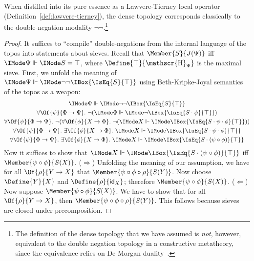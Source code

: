 \documentclass{article}
\DeclareMathOperator\OpYoneda{\mathscr{H}}
\newcommand\Yoneda[1]{\OpYoneda_{#1}}
\newcommand\ArrId[1]{\mathsf{id}_{#1}}
\begin{document}
\begin{lem}
  When distilled into its pure essence as a Lawvere-Tierney local
  operator (Definition~\ref{def:lawvere-tierney}), the dense topology
  corresponds classically to the double-negation modality
  $\lnot\lnot$.\footnote{The definition of the dense topology that we
    have assumed is \emph{not}, however, equivalent to the double
    negation topology in a constructive metatheory, since the
    equivalence relies on De Morgan
    duality~\cite{spitters:2010,coquand:2013}.}
\end{lem}
\begin{proof}
  It suffices to ``compile'' double-negations from the internal
  language of the topos into statements about sieves. Recall that
  $\Member{S}{J(\Psi)}$ iff $\Forces{\Psi}{S=\top}$, where
  $\Define{\top}{\Yoneda{\Psi}}$ is the maximal sieve. First, we
  unfold the meaning of
  $\Forces{\Psi}{\lnot\lnot\IBox{\IsEq{S}{\top}}}$ using
  Beth-Kripke-Joyal semantics of the topos as a weapon:
  \begin{gather}
    \Forces{\Psi}{\lnot\lnot\IBox{\IsEq{S}{\top}}}
    \\
    \forall\Of{\psi}{\Phi\to\Psi}.\
    \lnot(\Forces{\Phi}{\lnot\IBox{\IsEq{S\cdot\psi}{\top}}})
    \\
    \forall\Of{\psi}{\Phi\to\Psi}.\
    \lnot(
      \forall\Of{\phi}{X\to\Phi}.\
      \lnot(\Forces{X}{\IBox{\IsEq{S\cdot\psi\cdot\phi}{\top}}})
    )
    \label{de-morgan-1}
    \\
    \forall\Of{\psi}{\Phi\to\Psi}.\
    \exists\Of{\phi}{X\to \Phi}.\
    \Forces{X}{\IBox{\IsEq{S\cdot\psi\cdot\phi}{\top}}}
    \label{de-morgan-2}
    \\
    \forall\Of{\psi}{\Phi\to\Psi}.\
    \exists\Of{\phi}{X\to \Phi}.\
    \Forces{X}{\IBox{\IsEq{S\cdot(\psi\circ\phi)}{\top}}}
  \end{gather}
  Now it suffices to show that
  $\Forces{X}{\IBox{\IsEq{S\cdot(\psi\circ\phi)}{\top}}}$ iff
  $\Member{\psi\circ\phi}{S(X)}$.
  ($\Rightarrow$) Unfolding the meaning of our assumption, we have for
  all $\Of{\rho}{Y\to X}$ that
  $\Member{\psi\circ\phi\circ\rho}{S(Y)}$. Now choose $\Define{Y}{X}$
  and $\Define{\rho}{\ArrId{X}}$; therefore
  $\Member{\psi\circ\phi}{S(X)}$.
  ($\Leftarrow$) Now suppose $\Member{\psi\circ\phi}{S(X)}$. We have
  to show that for all $\Of{\rho}{Y\to X}$, then
  $\Member{\psi\circ\phi\circ\rho}{S(Y)}$. This follows because sieves
  are closed under precomposition.
\end{proof}
\end{document}
